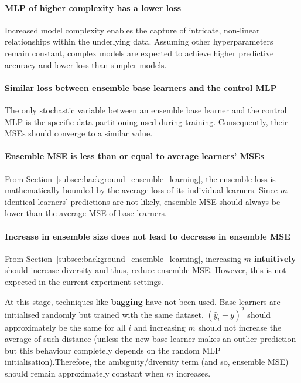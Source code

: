 \paragraph{MLP of higher complexity has a lower loss}
Increased model complexity enables the capture of intricate, non-linear relationships within the underlying data. Assuming other hyperparameters remain constant, complex models are expected to achieve higher predictive accuracy and lower loss than simpler models. 

\paragraph{Similar loss between ensemble base learners and the control MLP}
The only stochastic variable between an ensemble base learner and the control MLP is the specific data partitioning used during training. Consequently, their MSEs should converge to a similar value. 

\paragraph{Ensemble MSE is less than or equal to average learners' MSEs}
From Section~\ref{subsec:background_ensemble_learning}, the ensemble loss is mathematically bounded by the average loss of its individual learners. Since $m$ identical learners' predictions are not likely, ensemble MSE should always be lower than the average MSE of base learners. 

\paragraph{Increase in ensemble size does not lead to decrease in ensemble MSE}
From Section~\ref{subsec:background_ensemble_learning}, increasing $m$ \textbf{intuitively} should increase diversity and thus, reduce ensemble MSE. However, this is not expected in the current experiment settings. 

At this stage, techniques like \textbf{bagging} have not been used. Base learners are initialised randomly but trained with the same dataset. $(\hat{y}_i - \bar{y})^2$ should approximately be the same for all $i$ and increasing $m$ should not increase the average of such distance (unless the new base learner makes an outlier prediction but this behaviour completely depends on the random MLP initialisation).Therefore, the ambiguity/diversity term (and so, ensemble MSE) should remain approximately constant when $m$ increases. 

